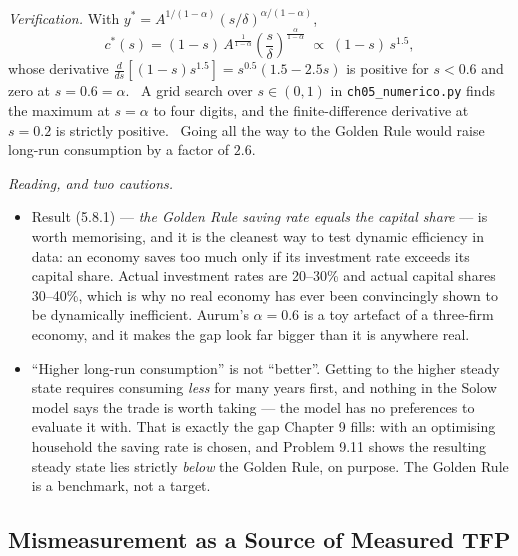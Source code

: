 \documentclass[12pt, letterpaper]{article}
\newcommand{\stst}{^{\ast}}
\begin{document}
\begin{tcolorbox}[evenbox,title={Problem 5.8 \quad National Accounts and The Golden Rule}]
\begin{enumerate}
\smallskip
\emph{Verification.} With $y\stst=A^{1/(1-\alpha)}(s/\delta)^{\alpha/(1-\alpha)}$,
\[
c\stst(s)=(1-s)\,A^{\frac{1}{1-\alpha}}\left(\frac{s}{\delta}\right)^{\frac{\alpha}{1-\alpha}}
\;\propto\;(1-s)\,s^{1.5},
\]
whose derivative $\frac{d}{ds}\left[(1-s)s^{1.5}\right]=s^{0.5}(1.5-2.5s)$ is positive for
$s<0.6$ and zero at $s=0.6=\alpha$. \checkmark\ A grid search over $s\in(0,1)$ in
\texttt{ch05\_numerico.py} finds the maximum at $s=\alpha$ to four digits, and the
finite-difference derivative at $s=0.2$ is strictly positive. \checkmark\ Going all the way
to the Golden Rule would raise long-run consumption by a factor of $2.6$.

\end{enumerate}

\smallskip
\emph{Reading, and two cautions.}
\begin{itemize}[leftmargin=1.3em,itemsep=3pt,topsep=3pt]
\item Result (5.8.1) --- \emph{the Golden Rule saving rate equals the capital share} --- is
      worth memorising, and it is the cleanest way to test dynamic efficiency in data: an
      economy saves too much only if its investment rate exceeds its capital share.
      Actual investment rates are 20--30\% and actual capital shares 30--40\%, which is why
      no real economy has ever been convincingly shown to be dynamically inefficient.
      Aurum's $\alpha=0.6$ is a toy artefact of a three-firm economy, and it makes the gap
      look far bigger than it is anywhere real.
\item ``Higher long-run consumption'' is not ``better''. Getting to the higher steady state
      requires consuming \emph{less} for many years first, and nothing in the Solow model
      says the trade is worth taking --- the model has no preferences to evaluate it with.
      That is exactly the gap Chapter 9 fills: with an optimising household the saving rate
      is chosen, and Problem 9.11 shows the resulting steady state lies strictly \emph{below}
      the Golden Rule, on purpose. The Golden Rule is a benchmark, not a target.
\end{itemize}
\end{tcolorbox}

\subsection{Mismeasurement as a Source of Measured TFP}
\end{document}
